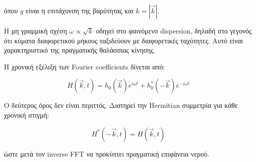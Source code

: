 \documentclass[a4paper, 11pt]{article}
\begin{document}
όπου \(g\) είναι η επιτάχυνση της βαρύτητας και \(k = |\vec{k}|\).

Η μη γραμμική σχέση \(\omega \propto \sqrt{k}\) οδηγεί στο φαινόμενο
dispersion, δηλαδή στο γεγονός ότι κύματα διαφορετικού μήκους ταξιδεύουν
με διαφορετικές ταχύτητες. Αυτό είναι χαρακτηριστικό της πραγματικής
θαλάσσιας κίνησης.

Η χρονική εξέλιξη των Fourier coefficients δίνεται από:

\[
H(\vec{k},t)
=
h_0(\vec{k})e^{i\omega t}
+
h_0^*(-\vec{k})e^{-i\omega t}
\]

Ο δεύτερος όρος δεν είναι περιττός. Διατηρεί την Hermitian συμμετρία για
κάθε χρονική στιγμή:

\[
H^*(-\vec{k},t)=H(\vec{k},t)
\]

ώστε μετά τον inverse FFT να προκύπτει πραγματική επιφάνεια νερού.
\end{document}
